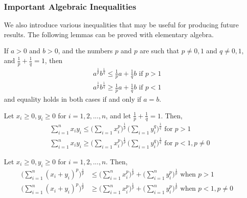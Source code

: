     \subsubsection{Important Algebraic Inequalities}

    We also introduce various inequalities that may be useful for producing future results. The following lemmas can be proved with elementary algebra. 

    \begin{lemma}
      If $a>0$ and $b>0$, and the numbers $p$ and $p$ are such that $p \neq 0, 1$ and $q \neq 0, 1$, and $\frac{1}{p} + \frac{1}{q} = 1$, then 
      \begin{align*}
          a^{\frac{1}{p}} b^{\frac{1}{q}} \leq \frac{1}{p} a + \frac{1}{q} b \text{  if } p > 1 \\
          a^{\frac{1}{p}} b^{\frac{1}{q}} \geq \frac{1}{p} a + \frac{1}{q} b \text{  if } p < 1
      \end{align*}
      and equality holds in both cases if and only if $a = b$. 
    \end{lemma}

    \begin{lemma}
      Let $x_i \geq 0, y_i \geq 0$ for $i = 1, 2, ..., n$, and let $\frac{1}{p} + \frac{1}{q} = 1$. Then, 
      \begin{align*}
          &\sum_{i=1}^n x_i y_i \leq \bigg( \sum_{i=1} x_i^p \bigg)^{\frac{1}{p}} \, \bigg( \sum_{i=1} y_i^q \bigg)^{\frac{1}{q}} \text{  for } p > 1 \\
          &\sum_{i=1}^n x_i y_i \geq \bigg( \sum_{i=1} x_i^p \bigg)^{\frac{1}{p}} \, \bigg( \sum_{i=1} y_i^q \bigg)^{\frac{1}{q}} \text{  for } p < 1, p \neq 0
      \end{align*}
    \end{lemma}

    \begin{lemma}
      Let $x_i \geq 0, y_i \geq 0$ for $i = 1, 2, ... ,n$. Then, 
      \begin{align*}
          \bigg( \sum_{i=1}^n (x_i + y_i)^p \bigg)^{\frac{1}{p}} & \leq \bigg( \sum_{i=1}^n x_i^p \bigg)^\frac{1}{p} + \bigg( \sum_{i=1}^n y_i^p \bigg)^{\frac{1}{p}} \text{  when } p > 1 \\
          \bigg( \sum_{i=1}^n (x_i + y_i)^p \bigg)^{\frac{1}{p}} & \geq \bigg( \sum_{i=1}^n x_i^p \bigg)^\frac{1}{p} + \bigg( \sum_{i=1}^n y_i^p \bigg)^{\frac{1}{p}} \text{  when } p < 1, p \neq 0
      \end{align*}
    \end{lemma}

